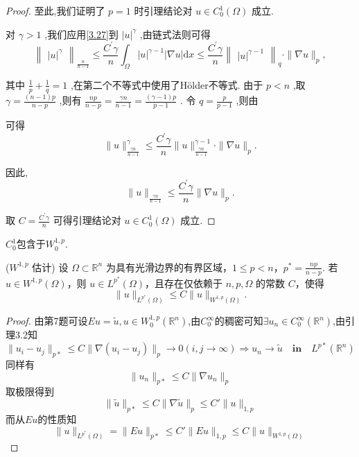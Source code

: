 \documentclass[lang=cn,newtx,10pt,scheme=chinese,thmcnt=chapter]{elegantbook}
\newcommand{\dif}{\mathrm{d}}
\begin{document}
\begin{problemset}
\begin{proof}
至此,我们证明了 \(p = 1\) 时引理结论对 \(u \in  {C}_{0}^{1}\left( \Omega \right)\) 成立.

对 \(\gamma  > 1\) ,我们应用\ref{3.27}到 \({\left| u\right| }^{\gamma }\) ,由链式法则可得
\begin{equation*}
{\begin{Vmatrix}{\left| u\right| }^{\gamma }\end{Vmatrix}}_{\frac{n}{n - 1}} \leqslant  \frac{{C}^{\prime }\gamma }{n}{\int }_{\Omega }{\left| u\right| }^{\gamma  - 1}\left| {\nabla u}\right| {\dif x}
\leqslant  \frac{{C}^{\prime }\gamma }{n}{\begin{Vmatrix}{\left| u\right| }^{\gamma  - 1}\end{Vmatrix}}_{q} \cdot  \parallel \nabla u{\parallel }_{p}, 
\end{equation*}

其中 \(\frac{1}{p} + \frac{1}{q} = 1\) ,在第二个不等式中使用了Hölder不等式.
由于 \(p < n\) ,取 \(\gamma  = \frac{\left( {n - 1}\right) p}{n - p}\) ,则有 \(\frac{np}{n - p} = \frac{\gamma n}{n - 1} = \frac{\left( {\gamma  - 1}\right) p}{p - 1}\) . 令 \(q = \frac{p}{p - 1}\) ,则由

可得
\begin{equation*}
\parallel u{\parallel }_{\frac{\gamma n}{n - 1}}^{\gamma } \leqslant  \frac{{C}^{\prime }\gamma }{n}\parallel u{\parallel }_{\frac{\gamma n}{n - 1}}^{\gamma  - 1} \cdot  \parallel \nabla u{\parallel }_{p}.
\end{equation*}

因此,
\begin{equation*}
\parallel u{\parallel }_{\frac{\gamma n}{n - 1}} \leqslant  \frac{{C}^{\prime }\gamma }{n}\parallel \nabla u{\parallel }_{p}.
\end{equation*}

取 \(C = \frac{{C}^{\prime }\gamma }{n}\) 可得引理结论对 \(u \in  {C}_{0}^{1}\left( \Omega \right)\) 成立.

\end{proof}
\begin{note}
    $C_0^1$包含于$W_0^{1,p}$.
\end{note}
\item (\({W}^{1,p}\) 估计)  
设 \(\Omega \subset {\mathbb{R}}^{n}\) 为具有光滑边界的有界区域，\(1 \leqslant p < n\)，\({p}^{*} = \frac{np}{n - p}\).  
若 \(u \in {W}^{1,p}(\Omega)\)，则 \(u \in L^{p^{*}}(\Omega)\)，且存在仅依赖于 \(n,p,\Omega\) 的常数 \(C\)，使得
\[
\|u\|_{L^{p^{*}}(\Omega)} \leqslant C\|u\|_{W^{1,p}(\Omega)}.
\]
\begin{proof}
    由第7题可设$Eu=\widetilde{u},u\in W_0^{1,p}(\mathbb{R}^n)$,由$C_0^\infty$的稠密可知$\exists u_n\in C_0^\infty(\mathbb{R}^n)$,由引理3.2知\[
    \|u_i-u_j\|_{p*}\leqslant C\|\nabla(u_i-u_j)\|_p\to 0(i,j\to \infty)\Rightarrow u_n\to \widetilde{u} \quad \textbf{in} \quad L^{p*}(\mathbb{R}^n)
    \]
    同样有\[\|u_n\|_{p*}\leqslant C \|\nabla u_n\|_p\]
    取极限得到
\[\|\widetilde{u}\|_{p*}\leqslant C\|\nabla \widetilde{u}\|_p\leqslant C'\|u\|_{1,p}\]
而从$Eu$的性质知\[
\|u\|_{L^{p^{*}}(\Omega)} =\|Eu\|_{p*}\leqslant C'\|Eu\|_{1,p}\leqslant C\|u\|_{W^{1,p}(\Omega)}
\]


\end{proof}
\end{problemset}
\end{document}
